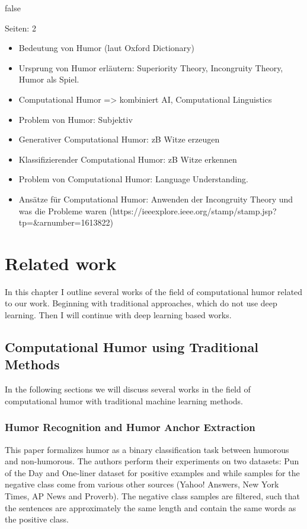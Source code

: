 \documentclass[draft,final,oneside]{vutinfth} %
\begin{document}
\if false

Seiten: 2
\begin{itemize}
\item Bedeutung von Humor (laut Oxford Dictionary)
\item Ursprung von Humor erläutern: Superiority Theory, Incongruity Theory, Humor als Spiel.
\item Computational Humor => kombiniert AI, Computational Linguistics
\item Problem von Humor: Subjektiv
\item Generativer Computational Humor: zB Witze erzeugen
\item Klassifizierender Computational Humor: zB Witze erkennen
\item Problem von Computational Humor: Language Understanding.
\item Ansätze für Computational Humor: Anwenden der Incongruity Theory und was die Probleme waren (https://ieeexplore.ieee.org/stamp/stamp.jsp?tp=\&arnumber=1613822)
\end{itemize}
\fi


\section{Related work} \label{relatedworkbackground}

In this chapter I outline several works of the field of computational humor related to our work. Beginning with traditional approaches, which do not use deep learning. Then I will continue with deep learning based works.


\subsection{Computational Humor using Traditional Methods}

In the following sections we will discuss several works in the field of computational humor with traditional machine learning methods.

\subsubsection{Humor Recognition and Humor Anchor Extraction \cite{Yang2015HumorRA}}

This paper formalizes humor as a binary classification task between humorous and non-humorous. The authors perform their experiments on two datasets: Pun of the Day and One-liner dataset for positive examples and while samples for the negative class come from various other sources (Yahoo! Answers, New York Times, AP News and Proverb). The negative class samples are filtered, such that the sentences are approximately the same length and contain the same words as the positive class.
\end{document}
